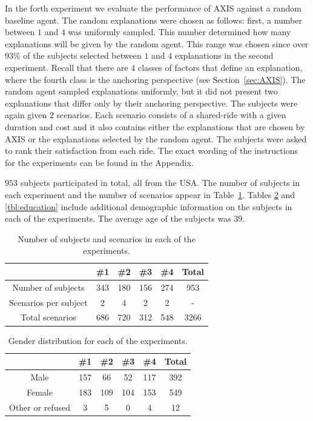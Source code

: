 \documentclass[letterpaper]{article} %
\begin{document}
In the forth experiment we evaluate the performance of AXIS against a random baseline agent.
The random explanations were chosen as follows: first, a number between $1$ and $4$ was uniformly sampled. This number determined how many explanations will be given by the random agent. This range was chosen since over $93\%$ of the subjects selected between $1$ and $4$ explanations in the second experiment.
Recall that there are 4 classes of factors that define an explanation, where the fourth class is the anchoring perspective (see Section~\ref{sec:AXIS}). The random agent sampled explanations uniformly, but it did not present two explanations that differ only by their anchoring perspective.
%
The subjects were again given $2$ scenarios. Each scenario consists of a shared-ride with a given duration and cost and it also contains either the explanations that are chosen by AXIS or the explanations selected by the random agent. The subjects were asked to rank their satisfaction from each ride.
The exact wording of the instructions for the experiments can be found in the Appendix.

$953$ subjects participated in total, all from the USA.
The number of subjects in each experiment and the number of scenarios appear in Table~\ref{tbl:participants}. 
Tables \ref{tbl:gender} and \ref{tbl:education} include additional demographic information on the subjects in each of the experiments. The average age of the subjects was $39$. %

\begin{table}
\centering
\begin{tabular}{ c|c c c c c } 
\hline
 & \#1 & \#2 & \#3 & \#4 & Total\\
 \hline
Number of subjects & 343 & 180 & 156 & 274 & 953\\
Scenarios per subject & 2 & 4 & 2 & 2 & -\\
Total scenarios & 686 & 720 & 312 & 548 & 3266\\
 \hline
\end{tabular}
\caption{Number of subjects and scenarios in each of the experiments.}
\label{tbl:participants}
\end{table}


\begin{table}
\centering
\begin{tabular}{ c|c c c c c} 
\hline
 & \#1 & \#2 & \#3 & \#4 & Total\\
 \hline
Male & 157 & 66 & 52 & 117 & 392\\
Female & 183 & 109 & 104 & 153 & 549\\
Other or refused & 3 & 5 & 0 & 4 & 12\\
 \hline
\end{tabular}
\caption{Gender distribution for each of the experiments.}
\label{tbl:gender}
\end{table}
\end{document}
